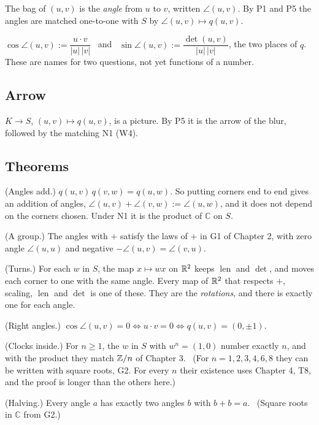 \begin{lines}
\item[\lab{N1}] The bag of $(u, v)$ is the \emph{angle} from $u$ to $v$, written $\angle(u, v)$. By P1 and P5 the angles are matched one-to-one with $S$ by $\angle(u,v) \mapsto q(u,v)$.
\item[\lab{N2}] $\cos \angle(u,v) := \dfrac{u \cdot v}{|u|\,|v|}$ \ and \ $\sin \angle(u,v) := \dfrac{\det(u,v)}{|u|\,|v|}$, the two places of $q$. These are names for two questions, not yet functions of a number.
\end{lines}

\subsection*{Arrow}

\begin{lines}
\item[\lab{P6}] $K \to S$, $(u, v) \mapsto q(u, v)$, is a picture. By P5 it is the arrow of the blur, followed by the matching N1 (W4).
\end{lines}

\subsection*{Theorems}

\begin{lines}
\item[\lab{T1}] (Angles add.) $q(u, v)\, q(v, w) = q(u, w)$. So putting corners end to end gives an addition of angles, $\angle(u,v) + \angle(v,w) := \angle(u,w)$, and it does not depend on the corners chosen. Under N1 it is the product of $\mathbb{C}$ on $S$.
\item[\lab{T2}] (A group.) The angles with $+$ satisfy the laws of $+$ in G1 of Chapter 2, with zero angle $\angle(u,u)$ and negative $-\angle(u,v) = \angle(v,u)$.
\item[\lab{T3}] (Turns.) For each $w$ in $S$, the map $x \mapsto w x$ on $\mathbb{R}^2$ keeps $\operatorname{len}$ and $\det$, and moves each corner to one with the same angle. Every map of $\mathbb{R}^2$ that respects $+$, scaling, $\operatorname{len}$ and $\det$ is one of these. They are the \emph{rotations}, and there is exactly one for each angle.
\item[\lab{T4}] (Right angles.) $\cos \angle(u,v) = 0 \iff u \cdot v = 0 \iff q(u,v) = (0, \pm 1)$.
\item[\lab{T5}] (Clocks inside.) For $n \ge 1$, the $w$ in $S$ with $w^n = (1,0)$ number exactly $n$, and with the product they match $\mathbb{Z}/n$ of Chapter 3. \ (For $n = 1, 2, 3, 4, 6, 8$ they can be written with square roots, G2. For every $n$ their existence uses Chapter 4, T8, and the proof is longer than the others here.)
\item[\lab{T6}] (Halving.) Every angle $a$ has exactly two angles $b$ with $b + b = a$. \ (Square roots in $\mathbb{C}$ from G2.)
\end{lines}

